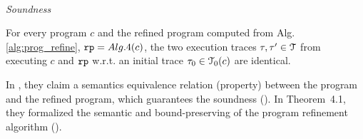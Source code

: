 %

\\
\emph{Soundness}
\begin{thm}
  \label{thm:sound_refined-prog}
  For every program $c$ and the refined program computed from Alg.\ref{alg:prog_refine}, $\mathtt{rp} = Alg.4(c)$,
  the two execution traces $\mathtt{\tau}, \mathtt{\tau}' \in \mathcal{T}$
  from executing $c$ and $\mathtt{rp}$ w.r.t. an initial trace $\mathtt{\tau}_0 \in \mathcal{T}_0(c)$ are identical.
\end{thm}
In \cite{GulwaniJK09}, they claim a semantics equivalence relation (property)
between the program and the refined program, which guarantees the soundness ().
%
In Theorem~4.1, they formalized the semantic and bound-preserving of the program refinement algorithm
().
%

